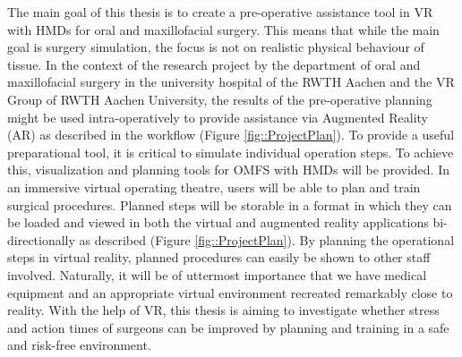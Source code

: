 The main goal of this thesis is to create a pre-operative assistance tool in VR with HMDs for oral and maxillofacial surgery.
This means that while the main goal is surgery simulation, the focus is not on realistic physical behaviour of tissue.
In the context of the research project by the department of oral and maxillofacial surgery in the university hospital of the RWTH Aachen and the VR Group of RWTH Aachen University, the results of the pre-operative planning might be used intra-operatively to provide assistance via Augmented Reality (AR) as described in the workflow (Figure \ref{fig::ProjectPlan}).
To provide a useful preparational tool, it is critical to simulate individual operation steps.
To achieve this, visualization and planning tools for OMFS with HMDs will be provided.
In an immersive virtual operating theatre, users will be able to plan and train surgical procedures.
Planned steps will be storable in a format in which they can be loaded and viewed in both the virtual and augmented reality applications bi-directionally as described (Figure \ref{fig::ProjectPlan}).
By planning the operational steps in virtual reality, planned procedures can easily be shown to other staff involved.
Naturally, it will be of uttermost importance that we have medical equipment and an appropriate virtual environment recreated remarkably close to reality.
With the help of VR, this thesis is aiming to investigate whether stress and action times of surgeons can be improved by planning and training in a safe and risk-free environment.